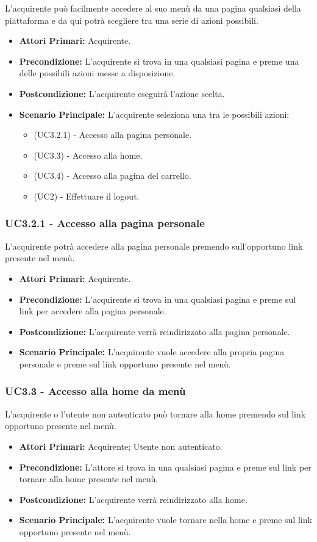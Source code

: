 L'acquirente può facilmente accedere al suo menù da una pagina qualsiasi della piattaforma e da qui potrà scegliere tra una serie di azioni possibili.
\begin{itemize}
    \item \textbf{Attori Primari:} Acquirente.
    \item \textbf{Precondizione:} L'acquirente si trova in una qualsiasi pagina e preme una delle possibili azioni messe a disposizione.
    \item \textbf{Postcondizione:} L'acquirente eseguirà l'azione scelta.
    \item \textbf{Scenario Principale:} L'acquirente seleziona una tra le possibili azioni:
    \begin{itemize}
        \item (UC3.2.1) - Accesso alla pagina personale.
        \item (UC3.3) - Accesso alla home.
        \item (UC3.4) - Accesso alla pagina del carrello.
        \item (UC2) - Effettuare il logout.
    \end{itemize}
\end{itemize}

\subsubsection{UC3.2.1 - Accesso alla pagina personale}\label{UC3.2.1}
L'acquirente potrà accedere alla pagina personale premendo sull'opportuno link presente nel menù.
\begin{itemize}
    \item \textbf{Attori Primari:} Acquirente.
    \item \textbf{Precondizione:} L'acquirente si trova in una qualsiasi pagina e preme sul link per accedere alla pagina personale.
    \item \textbf{Postcondizione:} L'acquirente verrà reindirizzato alla pagina personale.
    \item \textbf{Scenario Principale:} L'acquirente  vuole accedere alla propria pagina personale e preme sul link opportuno presente nel menù.
\end{itemize}

\subsubsection{UC3.3 - Accesso alla home da menù}\label{UC3.3}
L'acquirente o l'utente non autenticato può tornare alla home premendo sul link opportuno presente nel menù.
\begin{itemize}
    \item \textbf{Attori Primari:} Acquirente; Utente non autenticato.
    \item \textbf{Precondizione:} L'attore si trova in una qualsiasi pagina e preme sul link per tornare alla home presente nel menù.
    \item \textbf{Postcondizione:} L'acquirente verrà reindirizzato alla home.
    \item \textbf{Scenario Principale:} L'acquirente vuole tornare nella home e preme sul link opportuno presente nel menù.
\end{itemize}

